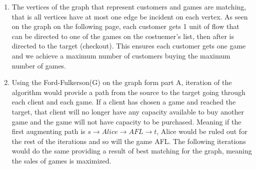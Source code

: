 \documentclass[9pt]{article}
\begin{document}
\begin{enumerate}
	\item The vertices of the graph that represent customers and games are matching, that is all vertices have at most one edge be incident on each vertex. 
	As seen on the graph on the following page, each customer gets 1 unit of flow that can be directed to one of the games on the costuemer's list, then after is directed to the target (checkout).
	This ensures each customer gets one game and we achieve a maximum number of customers buying the maximum number of games. 
	\item Using the Ford-Fulkerson(G) on the graph form part A, iteration of the algorithm would provide
	a path from the source to the target going through each client and each game. If a client has chosen a game and reached the target, that client will no longer have any capacity available to buy another game and the game will not have capacity to be purchased. 
	Meaning if the first augmenting path is $s \to Alice \to AFL \to t$, Alice would be ruled out for the rest of the iterations and so will the game AFL.
	The following iterations would do the same providing a result of best matching for the graph, meaning the sales of games is maximized.

\end{enumerate}
\newpage
\end{document}
